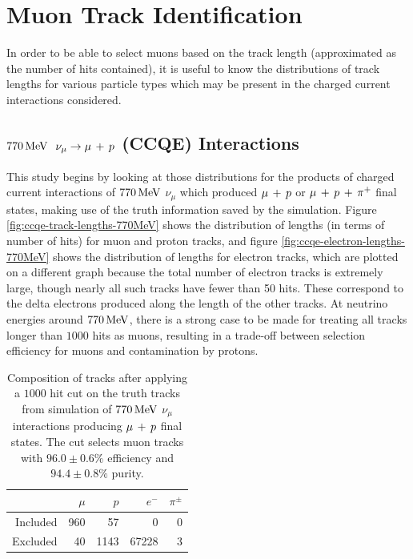 \section{Muon Track Identification}
In order to be able to select muons based on the track length (approximated as the number of hits contained), it is useful to know the distributions of track lengths for various particle types which may be present in the charged current interactions considered. 

\subsection{$770\MeV$ $\nu_\mu \rightarrow \mu\,+\,p$ (CCQE) Interactions}
This study begins by looking at those distributions for the products of charged current interactions of $770\MeV$ $\nu_\mu$ which produced $\mu\,+\,p$ or $\mu\,+\,p\,+\,\pi^{+}$ final states, making use of the truth information saved by the simulation. Figure \ref{fig:ccqe-track-lengths-770MeV} shows the distribution of lengths (in terms of number of hits) for muon and proton tracks, and figure \ref{fig:ccqe-electron-lengths-770MeV} shows the distribution of lengths for electron tracks, which are plotted on a different graph because the total number of electron tracks is extremely large, though nearly all such tracks have fewer than 50 hits. These correspond to the delta electrons produced along the length of the other tracks. At neutrino energies around $770\MeV$, there is a strong case to be made for treating all tracks longer than $1000$ hits as muons, resulting in a trade-off between selection efficiency for muons and contamination by protons.

\begin{table}
\centering
\begin{tabular}{*{5}{r}}
 & $\mu$ & $p$ & $e^-$ & $\pi^\pm$ \\
\hline
\hline
Included & 960 & 57 & 0 & 0 \\
Excluded & 40 & 1143 & 67228 & 3 \\
\hline
\end{tabular}
\caption[Composition of tracks after $1000$ hit cut on $770\MeV$ CCQE events]{\label{table:cut-results-ccqe-0.77}Composition of tracks after applying a $1000$ hit cut on the truth tracks from simulation of $770\MeV$ $\nu_\mu$ interactions producing $\mu\,+\,p$ final states. The cut selects muon tracks with $96.0\pm0.6\%$ efficiency and $94.4\pm0.8\%$ purity.}
\end{table}

